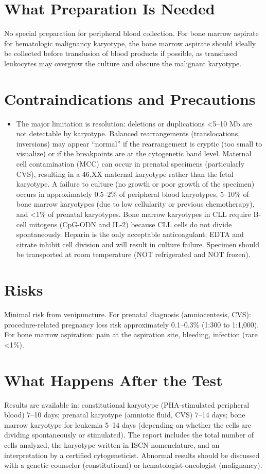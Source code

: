\section*{What Preparation Is Needed}
No special preparation for peripheral blood collection. For bone marrow aspirate for hematologic malignancy karyotype, the bone marrow aspirate should ideally be collected before transfusion of blood products if possible, as transfused leukocytes may overgrow the culture and obscure the malignant karyotype.

\section*{Contraindications and Precautions}
\begin{itemize}
  \item The major limitation is resolution: deletions or duplications <5--10 Mb are not detectable by karyotype. Balanced rearrangements (translocations, inversions) may appear ``normal'' if the rearrangement is cryptic (too small to visualize) or if the breakpoints are at the cytogenetic band level. Maternal cell contamination (MCC) can occur in prenatal specimens (particularly CVS), resulting in a 46,XX maternal karyotype rather than the fetal karyotype. A failure to culture (no growth or poor growth of the specimen) occurs in approximately 0.5--2\% of peripheral blood karyotypes, 5--10\% of bone marrow karyotypes (due to low cellularity or previous chemotherapy), and <1\% of prenatal karyotypes. Bone marrow karyotypes in CLL require B-cell mitogens (CpG-ODN and IL-2) because CLL cells do not divide spontaneously. Heparin is the only acceptable anticoagulant; EDTA and citrate inhibit cell division and will result in culture failure. Specimen should be transported at room temperature (NOT refrigerated and NOT frozen).
\end{itemize}
\section*{Risks}
Minimal risk from venipuncture. For prenatal diagnosis (amniocentesis, CVS): procedure-related pregnancy loss risk approximately 0.1--0.3\% (1:300 to 1:1,000). For bone marrow aspiration: pain at the aspiration site, bleeding, infection (rare <1\%).

\section*{What Happens After the Test}
Results are available in: constitutional karyotype (PHA-stimulated peripheral blood) 7--10 days; prenatal karyotype (amniotic fluid, CVS) 7--14 days; bone marrow karyotype for leukemia 5--14 days (depending on whether the cells are dividing spontaneously or stimulated). The report includes the total number of cells analyzed, the karyotype written in ISCN nomenclature, and an interpretation by a certified cytogeneticist. Abnormal results should be discussed with a genetic counselor (constitutional) or hematologist-oncologist (malignancy).

